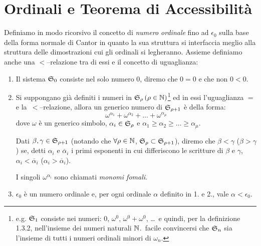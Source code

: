 \section{Ordinali e Teorema di Accessibilità}
	\begin{defin}
		Definiamo in modo ricorsivo il concetto di \emph{numero ordinale} fino ad $\epsilon_{0}$ sulla base della forma normale di Cantor in quanto la sua struttura si interfaccia meglio alla struttura delle dimostrazioni cui gli ordinali si legheranno. Assieme definiamo anche una $<$--relazione tra di essi e il concetto di uguaglianza:
		\begin{enumerate}
			\item Il sistema $\mathfrak{S}_{0}$ consiste nel solo numero $0$, diremo che $0 = 0$ e che non $0 < 0$.
			\item Si suppongano già definiti i numeri in $\mathfrak{S}_{\rho} \, (\rho \in \mathbb{N})$\footnote{e.g. $\mathfrak{S}_{1}$ consiste nei numeri: $0$, $\omega^{0}$, $\omega^{0} + \omega^{0}$, \ldots\ e quindi, per la definizione 1.3.2, nell'insieme dei numeri naturali $\mathbb{N}$.\ \Egrave facile convincersi che $\mathfrak{S}_{n}$ sia l'insieme di tutti i numeri ordinali minori di $\omega_{n}$.} ed in essi l'uguaglianza $=$ e la $\,<$--relazione, allora un generico numero di $\mathfrak{S}_{\rho+1}$ è della forma:
			\begin{equation}
				\omega^{\alpha_{1}} + \omega^{\alpha_{2}} + \ldots + \omega^{\alpha_{\mu}} \nonumber
			\end{equation}
			dove $\omega$ è un generico simbolo, $\alpha_{i} \in \mathfrak{S}_{\rho}$ e $\alpha_{1}\ge\alpha_{2}\ge\ldots\ge\alpha_{\mu}$. 
			
			Dati $\beta, \gamma \in \mathfrak{S}_{\rho+1}$ (notando che $\forall \rho\in\mathbb{N}$, $\mathfrak{S}_{\rho} \subset \mathfrak{S}_{\rho+1}$), diremo che $\beta<\gamma$ ($\beta>\gamma$) se, detti $\alpha_{i}$ e $\overline{\alpha}_{i}$ i primi esponenti in cui differiscono le scritture di $\beta$ e $\gamma$, $\alpha_{i}<\overline{\alpha}_{i}$ ($\alpha_{i}>\overline{\alpha}_{i}$). 
			
			I singoli $\omega^{\alpha_{i}}$ sono chiamati \emph{monomi fomali}.
			\item $\epsilon_{0}$ è un numero ordinale e, per ogni ordinale $\alpha$ definito in 1. e 2., vale $\alpha<\epsilon_{0}$.
		\end{enumerate}
	\end{defin}
